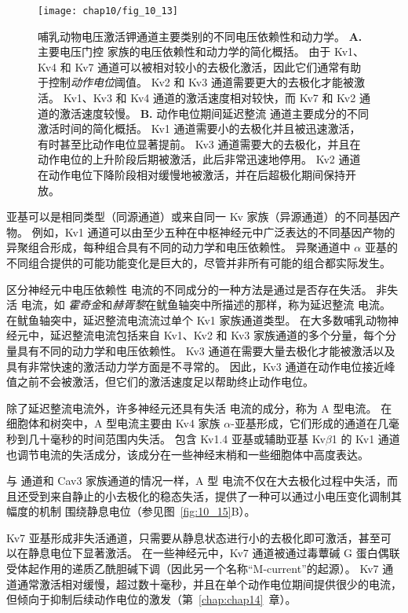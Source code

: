 \begin{figure}[htbp]
	\centering
	\texttt{[image: chap10/fig\_10\_13]}
	\caption{哺乳动物电压激活钾通道主要类别的不同电压依赖性和动力学。
		\textbf{A.} 主要电压门控  家族的电压依赖性和动力学的简化概括。
		由于 Kv1、Kv4 和 Kv7 通道可以被相对较小的去极化激活，因此它们通常有助于控制\textit{动作电位}阈值。
		Kv2 和 Kv3 通道需要更大的去极化才能被激活。
		Kv1、Kv3 和 Kv4 通道的激活速度相对较快，而 Kv7 和 Kv2 通道的激活速度较慢。
		\textbf{B.} 动作电位期间延迟整流  通道主要成分的不同激活时间的简化概括。
		Kv1 通道需要小的去极化并且被迅速激活，有时甚至比动作电位显著提前。
		Kv3 通道需要大的去极化，并且在动作电位的上升阶段后期被激活，此后非常迅速地停用。
		Kv2 通道在动作电位下降阶段相对缓慢地被激活，并在后超极化期间保持开放\cite{johnston2010symposium}。}
	\label{fig:10_13}
\end{figure}


亚基可以是相同类型（同源通道）或来自同一 Kv 家族（异源通道）的不同基因产物。
例如，Kv1 通道可以由至少五种在中枢神经元中广泛表达的不同基因产物的异聚组合形成，每种组合具有不同的动力学和电压依赖性。
异聚通道中 $\alpha$ 亚基的不同组合提供的可能功能变化是巨大的，尽管并非所有可能的组合都实际发生。


区分神经元中电压依赖性  电流的不同成分的一种方法是通过是否存在失活。
非失活  电流，如 \textit{霍奇金}和\textit{赫胥黎}在鱿鱼轴突中所描述的那样，称为延迟整流  电流。
在鱿鱼轴突中，延迟整流电流流过单个 Kv1 家族通道类型。
在大多数哺乳动物神经元中，延迟整流电流包括来自 Kv1、Kv2 和 Kv3 家族通道的多个分量，每个分量具有不同的动力学和电压依赖性。
Kv3 通道在需要大量去极化才能被激活以及具有非常快速的激活动力学方面是不寻常的。
因此，Kv3 通道在动作电位接近峰值之前不会被激活，但它们的激活速度足以帮助终止动作电位。


除了延迟整流电流外，许多神经元还具有失活  电流的成分，称为 A 型电流。
在细胞体和树突中，A 型电流主要由 Kv4 家族 $\alpha$-亚基形成，它们形成的通道在几毫秒到几十毫秒的时间范围内失活。
包含 Kv1.4 亚基或辅助亚基 Kv$\beta$1 的 Kv1 通道也调节电流的失活成分，该成分在一些神经末梢和一些细胞体中高度表达。


与  通道和 Cav3 家族通道的情况一样，A 型  电流不仅在大去极化过程中失活，而且还受到来自静止的小去极化的稳态失活，提供了一种可以通过小电压变化调制其幅度的机制 围绕静息电位（参见图~\ref{fig:10_15}B）。


Kv7 亚基形成非失活通道，只需要从静息状态进行小的去极化即可激活，甚至可以在静息电位下显著激活。
在一些神经元中，Kv7 通道被通过毒蕈碱 G 蛋白偶联受体起作用的递质乙酰胆碱下调（因此另一个名称“M-current”的起源）。
Kv7 通道通常激活相对缓慢，超过数十毫秒，并且在单个动作电位期间提供很少的电流，但倾向于抑制后续动作电位的激发（第~\ref{chap:chap14}~章）。


